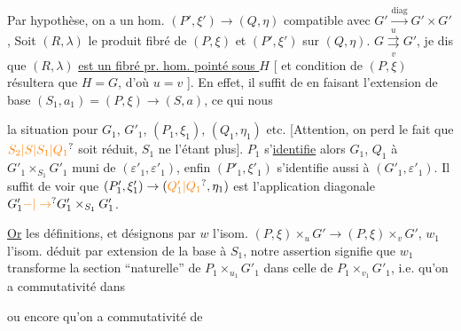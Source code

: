 Par hypothèse, on a un hom.  $(P',\xi')\longrightarrow(Q,\eta)$ compatible avec $G'\xrightarrow{\mathrm{diag}}G'\times G'$, Soit $(R,\lambda)$ le produit fibré de $(P,\xi)$ et $(P',\xi')$ sur $(Q,\eta)$.   $G\overset{u}{\underset{v}{\rightrightarrows}}G'$, je dis que $(R,\lambda)$ \uline{est un fibré pr. hom. pointé sous $H$} [ et  condition  de $(P,\xi)$ résultera  que $H=G$, d'où $u=v$ ]. En effet, il suffit de   en faisant l'extension de base $(S_1,a_1)=(P,\xi)\longrightarrow(S,a)$, ce qui nous 




la situation pour $G_1$, $G'_1$, $(P_1,\xi_1)$, $(Q_1,\eta_1)$ etc. [Attention, on perd le fait que $\unsure{S_2|S|S_1|Q_1}$ soit réduit, $S_1$ ne l'étant plus]. $P_1$ s'\uline{identifie} alors $G_1$, $Q_1$ à $G'_1\times_{S_1}G'_1$ muni de $(\varepsilon'_1,\varepsilon'_1)$,  enfin $(P'_1,\xi'_1)$ s'identifie aussi à $(G'_1,\varepsilon'_1)$. Il suffit de voir que $(P'_1,\xi'_1)\to(\unsure{Q'_1|Q_1},\eta_1)$ est l'application diagonale $G'_1\unsure{-|\to}G'_1\times_{S_1}G'_1$.

\uline{Or}  les définitions, et désignons par $w$ l'isom. $(P,\xi)\times_u G'\longrightarrow(P,\xi)\times_vG'$, $w_1$ l'isom. déduit par extension de la base à $S_1$, notre assertion signifie que $w_1$ transforme la section ``naturelle'' de $P_1\times_{u_1}G'_1$ dans celle de $P_1\times_{v_1}G'_1$, i.e. qu'on a commutativité dans


ou encore qu'on a commutativité de

